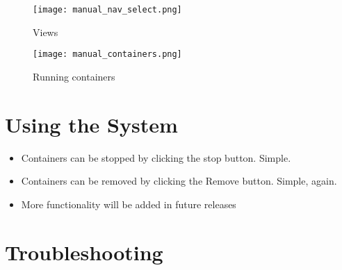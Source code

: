 \documentclass[]{article}
\begin{document}
\begin{figure}[H]
	\centering
	\texttt{[image: manual\_nav\_select.png]}
	\caption{Views}
\end{figure}

\begin{figure}[H]
	\centering
	\texttt{[image: manual\_containers.png]}
	\caption{Running containers}
\end{figure}

\section{Using the System}
\begin{itemize}
	\item Containers can be stopped by clicking the stop button. Simple.
	\item Containers can be removed by clicking the Remove button. Simple, again.
	\item More functionality will be added in future releases
\end{itemize}
\section{Troubleshooting}
\end{document}
